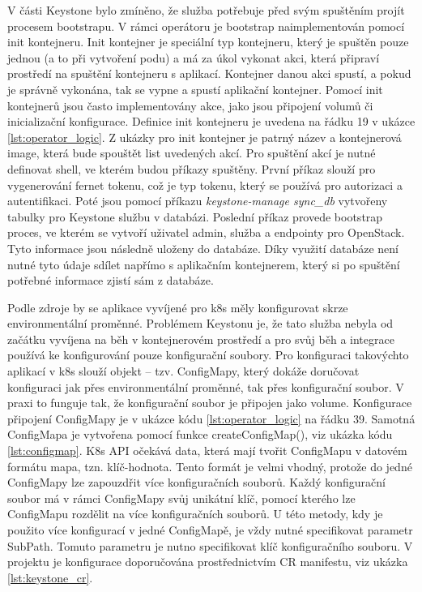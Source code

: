 V části Keystone bylo zmíněno, že služba potřebuje před svým spuštěním projít procesem bootstrapu. V rámci operátoru je bootstrap naimplementován pomocí init kontejneru. Init kontejner je speciální typ kontejneru, který je spuštěn pouze jednou (a to při vytvoření podu) a má za úkol vykonat akci, která připraví prostředí na spuštění kontejneru s aplikací. Kontejner danou akci spustí, a pokud je správně vykonána, tak se vypne a spustí aplikační kontejner. Pomocí init kontejnerů jsou často implementovány akce, jako jsou připojení volumů či inicializační konfigurace. Definice init kontejneru je uvedena na řádku 19 v ukázce \ref{lst:operator_logic}. Z ukázky pro init kontejner je patrný název a kontejnerová image, která bude spouštět list uvedených akcí. Pro spuštění akcí je nutné definovat shell, ve kterém budou příkazy spuštěny. První příkaz slouží pro vygenerování fernet tokenu, což je typ tokenu, který se používá pro autorizaci a autentifikaci. Poté jsou pomocí příkazu \textit{keystone-manage sync\_db} vytvořeny tabulky pro Keystone službu v databázi. Poslední příkaz provede bootstrap proces, ve kterém se vytvoří uživatel admin, služba a endpointy pro OpenStack. Tyto informace jsou následně uloženy do databáze. Díky využití databáze není nutné tyto údaje sdílet napřímo s aplikačním kontejnerem, který si po spuštění potřebné informace zjistí sám z databáze.

Podle zdroje \cite{mastering_k8s} by se aplikace vyvíjené pro k8s měly konfigurovat skrze environmentální proměnné. Problémem Keystonu je, že tato služba nebyla od začátku vyvíjena na běh v kontejnerovém prostředí a pro svůj běh a integrace používá ke konfigurování pouze konfigurační soubory. Pro konfiguraci takovýchto aplikací v k8s slouží objekt – tzv. ConfigMapy, který dokáže doručovat konfiguraci jak přes environmentální proměnné, tak přes konfigurační soubor. V praxi to funguje tak, že konfigurační soubor je připojen jako volume. Konfigurace připojení ConfigMapy je v ukázce kódu \ref{lst:operator_logic} na řádku 39. Samotná ConfigMapa je vytvořena pomocí funkce createConfigMap(), viz ukázka kódu \ref{lst:configmap}. K8s API očekává data, která mají tvořit ConfigMapu v datovém formátu mapa, tzn. klíč-hodnota. Tento formát je velmi vhodný, protože do jedné ConfigMapy lze zapouzdřit více konfiguračních souborů. Každý konfigurační soubor má v rámci ConfigMapy svůj unikátní klíč, pomocí kterého lze ConfigMapu rozdělit na více konfiguračních souborů. U této metody, kdy je použito více konfigurací v jedné ConfigMapě, je vždy nutné specifikovat parametr SubPath. Tomuto parametru je nutno specifikovat klíč konfiguračního souboru. V projektu je konfigurace doporučována prostřednictvím CR manifestu, viz ukázka \ref{lst:keystone_cr}.

